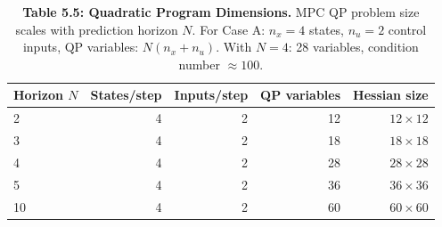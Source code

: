 \begin{table}[H]
\centering
\caption{\textbf{Table 5.5: Quadratic Program Dimensions.} MPC QP problem size scales with prediction horizon $N$. For Case A: $n_x = 4$ states, $n_u = 2$ control inputs, QP variables: $N(n_x + n_u)$. With $N = 4$: 28 variables, condition number $\approx 100$.}
\label{tab:5-5}
\small
\begin{tabular}{lrrrr}
\toprule
\textbf{Horizon $N$} & \textbf{States/step} & \textbf{Inputs/step} & \textbf{QP variables} & \textbf{Hessian size} \\
\midrule
\rowcolor{gray!15}
2 & 4 & 2 & 12 & $12 \times 12$ \\
3 & 4 & 2 & 18 & $18 \times 18$ \\
\rowcolor{gray!15}
4 & 4 & 2 & 28 & $28 \times 28$ \\
5 & 4 & 2 & 36 & $36 \times 36$ \\
\rowcolor{gray!15}
10 & 4 & 2 & 60 & $60 \times 60$ \\
\bottomrule
\end{tabular}
\end{table}
